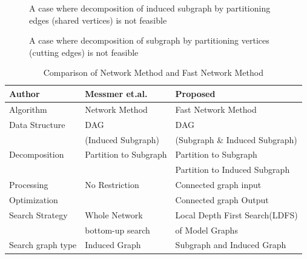 \begin{enumerate}
\begin{enumerate}
\end{enumerate}





\begin{figure}
\centering

\caption{A case where decomposition of induced subgraph by partitioning edges (shared vertices) is not feasible \label{fig:fig66} }
\end{figure}


\begin{figure}
\centering

\caption{A case where decomposition of subgraph by partitioning vertices (cutting edges) is not feasible \label{fig:fig7} }
\end{figure}


\begin{table}
\begin{center}
\begin{tabular}{|l|l|l|}
\hline
Author  & Messmer et.al.  & Proposed  \\ \hline
Algorithm & Network Method & Fast Network Method \\ \hline
Data Structure & DAG                 & DAG                            \\ 
               &  (Induced Subgraph) &  (Subgraph \& Induced Subgraph) \\ \hline
Decomposition  & Partition to Subgraph  & Partition to Subgraph \\ 
               &                        & Partition to Induced Subgraph \\ \hline
Processing    & No Restriction  & Connected graph input                     \\ 
Optimization      &                   & Connected graph Output                 \\ \hline 
Search Strategy & Whole Network           & Local Depth First Search(LDFS) \\ 
                & bottom-up search          &  of Model Graphs   \\ \hline
Search graph type & Induced Graph & Subgraph and Induced Graph \\ \hline

\end{tabular}
\caption{ Comparison of Network Method and Fast Network Method \label{tab:table1} }
\end{center}
\end{table}
